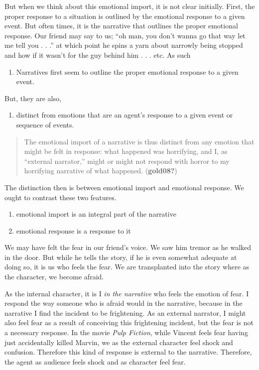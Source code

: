 \documentclass[
]{article}
\providecommand{\tightlist}{%
  \setlength{\itemsep}{0pt}\setlength{\parskip}{0pt}}
\begin{document}
But when we think about this emotional import, it is not clear
initially. First, the proper response to a situation is outlined by the
emotional response to a given event. But often times, it is the
narrative that outlines the proper emotional response. Our friend may
say to us; ``oh man, you don't wanna go that way let me tell you . . .''
at which point he spins a yarn about narrowly being stopped and how if
it wasn't for the guy behind him . . . etc. As such

\begin{enumerate}
\def\labelenumi{\arabic{enumi}.}
\tightlist
\item
  Narratives first seem to outline the proper emotional response to a
  given event.
\end{enumerate}

But, they are also,

\begin{enumerate}
\def\labelenumi{\arabic{enumi}.}
\setcounter{enumi}{1}
\tightlist
\item
  distinct from emotions that are an agent's response to a given event
  or sequence of events.
\end{enumerate}

\begin{quote}
The emotional import of a narrative is thus distinct from any emotion
that might be felt in response: what happened was horrifying, and I, as
``external narrator,'' might or might not respond with horror to my
horrifying narrative of what happened. (\textbf{gold08?})
\end{quote}

The distinction then is between emotional import and emotional response.
We ought to contrast these two features.

\begin{enumerate}
\def\labelenumi{\arabic{enumi}.}
\item
  emotional import is an integral part of the narrative
\item
  emotional response is a response to it
\end{enumerate}

We may have felt the fear in our friend's voice. We saw him tremor as he
walked in the door. But while he tells the story, if he is even somewhat
adequate at doing so, it is us who feels the fear. We are transplanted
into the story where as the character, we become afraid.

As the internal character, it is I \emph{in the narrative} who feels the
emotion of fear. I respond the way someone who is afraid would in the
narrative, because in the narrative I find the incident to be
frightening. As an external narrator, I might also feel fear as a result
of conceiving this frightening incident, but the fear is not a necessary
response. In the movie \emph{Pulp Fiction}, while Vincent feels fear
having just accidentally killed Marvin, we as the external character
feel shock and confusion. Therefore this kind of response is external to
the narrative. Therefore, the agent as audience feels shock and as
character feel fear.
\end{document}
